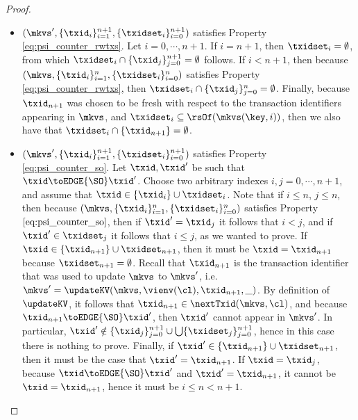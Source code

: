 \begin{proof}
\begin{itemize}
\begin{itemize}
\item $(\mkvs', \{\txid_{i}\}_{i=1}^{n+1}, \{\txidset_{i}\}_{i=0}^{n+1})$ 
satisfies Property \eqref{eq:psi_counter_rwtxs}. Let $i =0, \cdots, n+1$. If $i = n+1$, then 
$\txidset_{i} = \emptyset$, from which $\txidset_{i} \cap \{\txid_{j}\}_{j=0}^{n+1} = \emptyset$ follows. If $i < n+1$, then 
because $(\mkvs, \{\txid_{i}\}_{i=1}^{n}, \{\txidset_{i}\}_{i=0}^{n})$ 
satisfies Property \eqref{eq:psi_counter_rwtxs}, then $\txidset_{i} \cap \{\txid_{j}\}_{j=0}^{n} = \emptyset$. 
Finally, because $\txid_{n+1}$ was chosen to be fresh with respect to the transaction identifiers appearing in 
$\mkvs$, and $\txidset_{i} \subseteq \rsOf(\mkvs(\key, i))$, then  we also have that $\txidset_{i} \cap \{\txid_{n+1}\} = \emptyset$. 
\item $(\mkvs', \{\txid_{i}\}_{i=1}^{n+1}, \{\txidset_{i}\}_{i=0}^{n+1})$ satisfies Property \eqref{eq:psi_counter_so}. Let 
$\txid, \txid'$ be such that $\txid \toEDGE{\SO} \txid'$. Choose two arbitrary indexes $i,j=0,\cdots, n+1$, 
and assume that $\txid \in \{\txid_{i}\} \cup \txidset_{i}$. Note that if $i \leq n$, $j \leq n$, then 
because $(\mkvs, \{\txid_{i}\}_{i=1}^{n}, \{\txidset_{i}\}_{i=0}^{n})$ satisfies Property $\eqref{eq:psi_counter_so}$, then 
if $\txid' = \txid_{j}$ it follows that $i < j$, and if $\txid' \in \txidset_{j}$ it follows that $i \leq j$, as 
we wanted to prove. 
If $\txid \in \{\txid_{n+1}\} \cup \txidset_{n+1}$, then it must be $\txid = \txid_{n+1}$ because 
$\txidset_{n+1} = \emptyset$. Recall that $\txid_{n+1}$ is the transaction identifier that was used 
to update $\mkvs$ to $\mkvs'$, i.e. $\mkvs' = \updateKV(\mkvs, \vienv(\cl), \txid_{n+1}, \_)$. By 
definition of $\updateKV$, it follows that $\txid_{n+1} \in \nextTxid(\mkvs, \cl)$, 
and because $\txid_{n+1} \toEDGE{\SO} \txid'$, then $\txid'$ cannot appear in $\mkvs'$. 
In particular, 
$\txid' \notin \{\txid_{j}\}_{j=0}^{n+1} \cup \bigcup \{\txidset_{j}\}_{j=0}^{n+1}$, hence in this case there is nothing to prove. 
Finally, if $\txid' \in \{\txid_{n+1}\} \cup \txidset_{n+1}$, then 
it must be the case that $\txid' = \txid_{n+1}$. If $\txid = \txid_{j}$, because 
$\txid \toEDGE{\SO} \txid'$ and $\txid' = \txid_{n+1}$, it cannot be $\txid = \txid_{n+1}$, 
hence it must be $i \leq n < n+1$. 

\end{itemize}
\end{itemize}
\end{proof}
